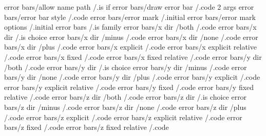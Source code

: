 error bars/allow name path                 /.is if      
error bars/draw error bar                  /.code 2 args
error bars/error bar style                 /.code       
error bars/error mark                      /.initial    
error bars/error mark options              /.initial    
error bars                                 /.is family
error bars/x dir              /both        /.code
error bars/x dir                           /.is choice
error bars/x dir              /minus       /.code
error bars/x dir              /none        /.code
error bars/x dir              /plus        /.code
error bars/x explicit                      /.code       
error bars/x explicit relative             /.code       
error bars/x fixed                         /.code       
error bars/x fixed relative                /.code       
error bars/y dir              /both        /.code
error bars/y dir                           /.is choice
error bars/y dir              /minus       /.code
error bars/y dir              /none        /.code
error bars/y dir              /plus        /.code
error bars/y explicit                      /.code       
error bars/y explicit relative             /.code       
error bars/y fixed                         /.code       
error bars/y fixed relative                /.code       
error bars/z dir              /both        /.code
error bars/z dir                           /.is choice
error bars/z dir              /minus       /.code
error bars/z dir              /none        /.code
error bars/z dir              /plus        /.code
error bars/z explicit                      /.code       
error bars/z explicit relative             /.code       
error bars/z fixed                         /.code       
error bars/z fixed relative                /.code       

